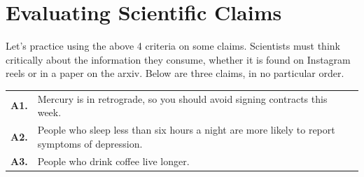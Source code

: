 \documentclass[11pt]{article}
\begin{document}
\section{Evaluating Scientific Claims}
Let's practice using the above 4  criteria on some claims. Scientists must think critically about  the information they consume, whether it is found on Instagram reels or in a paper on the arxiv.
Below are three claims, in no particular order.
\begin{center}
\begin{tabular}{@{}p{}p{}@{}}
\textbf{A1.} & Mercury is in retrograde, so you should avoid signing
contracts this week. \\[6pt]
\textbf{A2.} & People who sleep less than six hours a night are more likely
to report symptoms of depression. \\[6pt]
\textbf{A3.} & People who drink coffee live longer.
\end{tabular}
\end{center}
\end{document}
